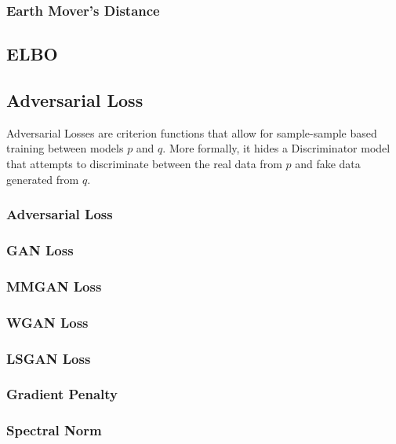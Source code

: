 \subsubsection{Earth Mover's Distance}

\subsection{ELBO}


\subsection{Adversarial Loss}
Adversarial Losses are criterion functions that allow for sample-sample based
training between models $p$ and $q$. More formally, it hides a Discriminator
model that attempts to discriminate between the real data from $p$ and fake data
generated from $q$.
\subsubsection{Adversarial Loss}
\subsubsection{GAN Loss}
\subsubsection{MMGAN Loss}
\subsubsection{WGAN Loss}
\subsubsection{LSGAN Loss}
\subsubsection{Gradient Penalty}
\subsubsection{Spectral Norm}
